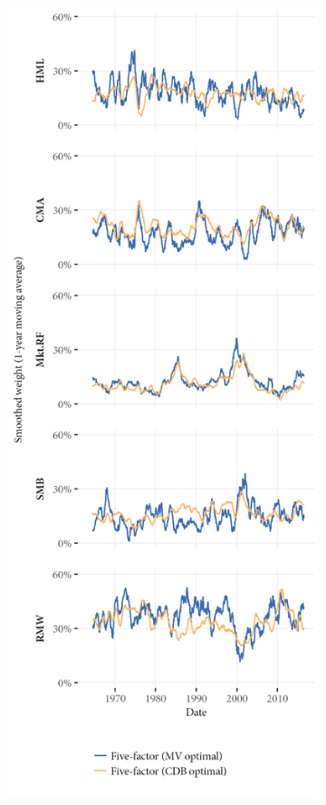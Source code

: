 \begin{figure}[htbp]
  \centering
  \footnotesize
  \begin{subfigure}{0.45\textwidth}
    \includegraphics[width=\textwidth]{graphics/weights/compare_Weights_CDB_MV_5F.png}

\end{subfigure}
\end{figure}
